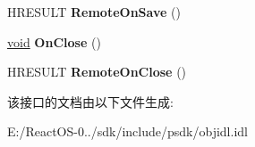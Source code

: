 \begin{DoxyCompactItemize}
\item 
\mbox{\label{interface_i_advise_sink_af20b3ed8b7a987dd4e1e03d50b85fd35}} 
H\+R\+E\+S\+U\+LT {\bfseries Remote\+On\+Save} ()
\item 
\mbox{\label{interface_i_advise_sink_af914a395c6e4e16311c0224fcf2b4aa9}} 
\hyperlink{interfacevoid}{void} {\bfseries On\+Close} ()
\item 
\mbox{\label{interface_i_advise_sink_a1a773da3722261ff4f7a88699328f871}} 
H\+R\+E\+S\+U\+LT {\bfseries Remote\+On\+Close} ()
\end{DoxyCompactItemize}


该接口的文档由以下文件生成\+:\begin{DoxyCompactItemize}
\item 
E\+:/\+React\+O\+S-\/0../sdk/include/psdk/objidl.\+idl\end{DoxyCompactItemize}
